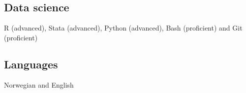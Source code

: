\documentclass[11pt,]{article}
\begin{document}
\hypertarget{data-science}{%
\subsection{Data science}\label{data-science}}

R (advanced), Stata (advanced), Python (advanced), Bash (proficient) and
Git (proficient)\vspace{-0.2cm}

\vspace{0.5cm}

\vspace{-0.3cm}

\hypertarget{languages}{%
\subsection{Languages}\label{languages}}

Norwegian and English\vspace{-0.2cm}

\vspace{0.5cm}
\end{document}

